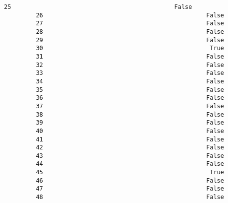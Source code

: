 \documentclass[11pt]{article}
\begin{document}
\begin{Verbatim}[commandchars=\\\{\}]
         25                                              False                                     
         26                                              False                                     
         27                                              False                                     
         28                                              False                                     
         29                                              False                                     
         30                                               True                                     
         31                                              False                                     
         32                                              False                                     
         33                                              False                                     
         34                                              False                                     
         35                                              False                                     
         36                                              False                                     
         37                                              False                                     
         38                                              False                                     
         39                                              False                                     
         40                                              False                                     
         41                                              False                                     
         42                                              False                                     
         43                                              False                                     
         44                                              False                                     
         45                                               True                                     
         46                                              False                                     
         47                                              False                                     
         48                                              False                                     
         

\end{Verbatim}
\end{document}
